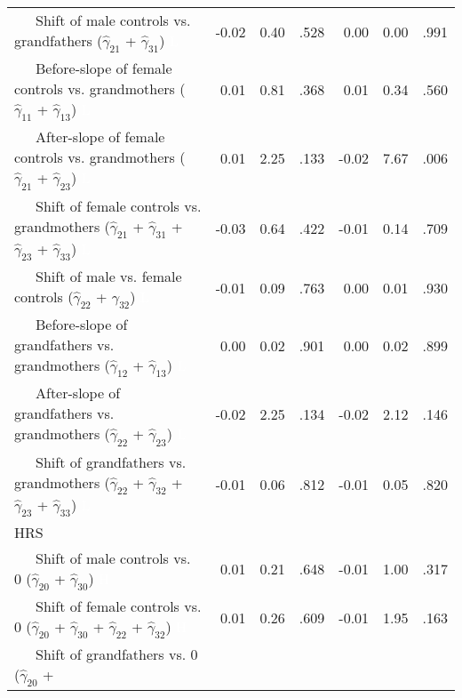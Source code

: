 \documentclass[
  english,
  man, noextraspace]{apa7}
\newenvironment{lltable}{\begin{landscape}\begin{center}\begin{ThreePartTable}}{\end{ThreePartTable}\end{center}\end{landscape}}
\begin{document}
\begin{lltable}
{\begin{longtable}{lrrrrrr}
\ \ \ Shift of male controls vs. grandfathers 
                              ($\hat{\gamma}_{21}$ + $\hat{\gamma}_{31}$) \textcolor{white}{L} & -0.02 & 0.40 & .528 & 0.00 & 0.00 & .991\\
\ \ \ Before-slope of female controls vs. grandmothers 
                              ($\hat{\gamma}_{11}$ + $\hat{\gamma}_{13}$) \textcolor{white}{L} & 0.01 & 0.81 & .368 & 0.01 & 0.34 & .560\\
\ \ \ After-slope of female controls vs. grandmothers 
                              ($\hat{\gamma}_{21}$ + $\hat{\gamma}_{23}$) \textcolor{white}{L} & 0.01 & 2.25 & .133 & -0.02 & 7.67 & .006\\
\ \ \ Shift of female controls vs. grandmothers 
                              ($\hat{\gamma}_{21}$ + $\hat{\gamma}_{31}$ + 
                              $\hat{\gamma}_{23}$ + $\hat{\gamma}_{33}$) \textcolor{white}{L} & -0.03 & 0.64 & .422 & -0.01 & 0.14 & .709\\
\ \ \ Shift of male vs. female controls 
                              ($\hat{\gamma}_{22}$ + $\hat{\gamma}_{32}$) \textcolor{white}{L} & -0.01 & 0.09 & .763 & 0.00 & 0.01 & .930\\
\ \ \ Before-slope of grandfathers vs. grandmothers 
                              ($\hat{\gamma}_{12}$ + $\hat{\gamma}_{13}$) \textcolor{white}{L} & 0.00 & 0.02 & .901 & 0.00 & 0.02 & .899\\
\ \ \ After-slope of grandfathers vs. grandmothers 
                              ($\hat{\gamma}_{22}$ + $\hat{\gamma}_{23}$) \textcolor{white}{L} & -0.02 & 2.25 & .134 & -0.02 & 2.12 & .146\\
\ \ \ Shift of grandfathers vs. grandmothers 
                              ($\hat{\gamma}_{22}$ + $\hat{\gamma}_{32}$ + 
                              $\hat{\gamma}_{23}$ + $\hat{\gamma}_{33}$) \textcolor{white}{L} & -0.01 & 0.06 & .812 & -0.01 & 0.05 & .820\\
HRS &  &  &  &  &  & \\
\ \ \ Shift of male controls vs. 0 ($\hat{\gamma}_{20}$ + 
                              $\hat{\gamma}_{30}$) \textcolor{white}{H} & 0.01 & 0.21 & .648 & -0.01 & 1.00 & .317\\
\ \ \ Shift of female controls vs. 0 ($\hat{\gamma}_{20}$ + 
                              $\hat{\gamma}_{30}$ + $\hat{\gamma}_{22}$ + 
                              $\hat{\gamma}_{32}$) \textcolor{white}{H} & 0.01 & 0.26 & .609 & -0.01 & 1.95 & .163\\
\ \ \ Shift of grandfathers vs. 0 ($\hat{\gamma}_{20}$ + 

\end{longtable}}
\end{lltable}
\end{document}
